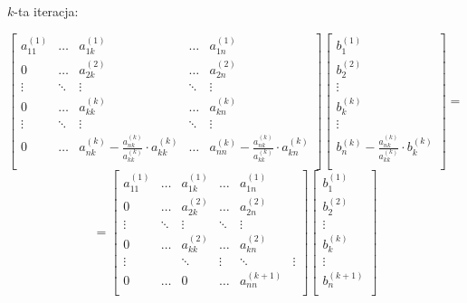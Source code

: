 \documentclass{article}
\begin{document}
$k$-ta iteracja:
\begin{center}
    $$
    \begin{bmatrix}
        a^{(1)}_{11} & \dots & a^{(1)}_{1k} & \dots & a^{(1)}_{1n} \\
        0 & \dots & a^{(2)}_{2k} & \dots & a^{(2)}_{2n} \\
        \vdots & \ddots &\vdots & \ddots & \vdots \\
        0 & \dots & a^{(k)}_{kk} & \dots & a^{(k)}_{kn} \\
        \vdots & \ddots & \vdots & \ddots & \vdots \\
        0 &  \dots & a^{(k)}_{nk} -\frac{a^{(k)}_{nk}}{a^{(k)}_{kk}} \cdot a^{(k)}_{kk} & \dots & a^{(k)}_{nn} -\frac{a^{(k)}_{nk}}{a^{(k)}_{kk}} \cdot a^{(k)}_{kn} \\
    \end{bmatrix}
    \begin{bmatrix}
        b^{(1)}_{1} \\
        b^{(2)}_{2} \\
        \vdots \\
        b^{(k)}_{k} \\
        \vdots \\
        b^{(k)}_{n} -\frac{a^{(k)}_{nk}}{a^{(k)}_{kk}} \cdot b^{(k)}_{k} \\
    \end{bmatrix}
    =
    $$
    $$
    =
    \begin{bmatrix}
        a^{(1)}_{11} & \dots & a^{(1)}_{1k} & \dots & a^{(1)}_{1n} \\
        0 & \dots & a^{(2)}_{2k} & \dots & a^{(2)}_{2n} \\
        \vdots & \ddots &\vdots & \ddots & \vdots \\
        0  & \dots & a^{(2)}_{kk} & \dots & a^{(2)}_{kn} \\
        \vdots &  & \ddots & \vdots & \ddots & \vdots \\
        0 & \dots & 0 & \dots & a^{(k+1)}_{nn} \\
    \end{bmatrix}
    \begin{bmatrix}
        b^{(1)}_{1} \\
        b^{(2)}_{2} \\
        \vdots \\
        b^{(k)}_{k} \\
        \vdots \\
        b^{(k+1)}_{n} \\
    \end{bmatrix}
    $$
\end{center}
\end{document}
